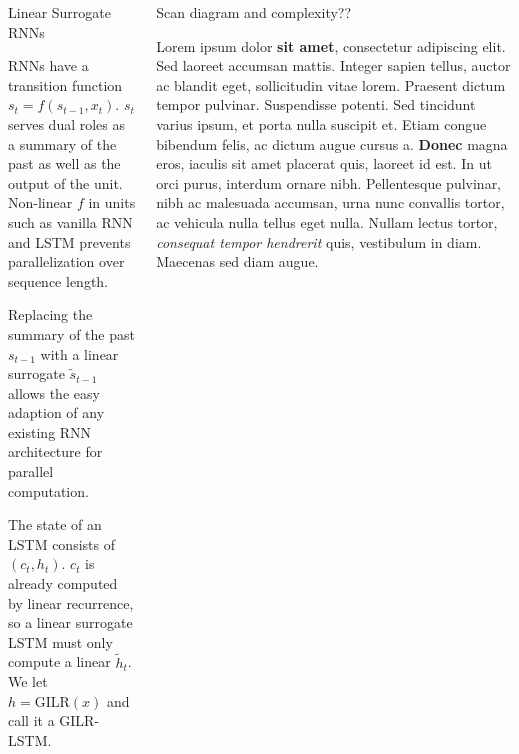 \documentclass[final]{beamer}
\newlength{\onecolwid}
\newlength{\twocolwid}
\begin{document}
\begin{frame}[t]
\begin{columns}[t]
\begin{column}{\twocolwid}
\begin{columns}[t,totalwidth=\twocolwid]
\begin{column}{\onecolwid}\vspace{-.6in} %


\begin{block}{Linear Surrogate RNNs}

RNNs have a transition function $s_t = f(s_{t-1},x_t)$. $s_t$ serves dual roles as a
summary of the past as well as the output of the unit. Non-linear $f$ in units such
as vanilla RNN and LSTM prevents parallelization over sequence length.

Replacing the summary of the past $s_{t-1}$ with a linear surrogate $\tilde{s}_{t-1}$
allows the easy adaption of any existing RNN architecture for parallel computation.

The state of an LSTM consists of $(c_t, h_t)$. $c_t$ is already computed
by linear recurrence, so a linear surrogate LSTM must only compute a
linear $\tilde{h}_t$. We let $h = \text{GILR}(x)$ and call it a GILR-LSTM.

\end{block}


\end{column} %

\begin{column}{\onecolwid}\vspace{-.6in} %


\begin{block}{Scan diagram and complexity??}

Lorem ipsum dolor \textbf{sit amet}, consectetur adipiscing elit. Sed laoreet accumsan mattis. Integer sapien tellus, auctor ac blandit eget, sollicitudin vitae lorem. Praesent dictum tempor pulvinar. Suspendisse potenti. Sed tincidunt varius ipsum, et porta nulla suscipit et. Etiam congue bibendum felis, ac dictum augue cursus a. \textbf{Donec} magna eros, iaculis sit amet placerat quis, laoreet id est. In ut orci purus, interdum ornare nibh. Pellentesque pulvinar, nibh ac malesuada accumsan, urna nunc convallis tortor, ac vehicula nulla tellus eget nulla. Nullam lectus tortor, \textit{consequat tempor hendrerit} quis, vestibulum in diam. Maecenas sed diam augue.


\end{block}
\end{column}
\end{columns}
\end{column}
\end{columns}
\end{frame}
\end{document}
